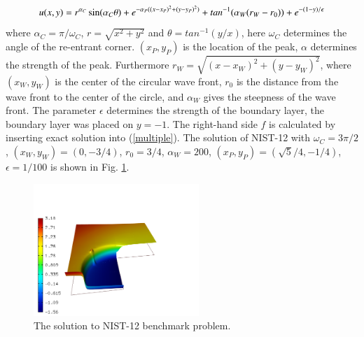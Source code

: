 \documentclass[12pt]{elsarticle}
\begin{document}
\[
u(x,y) =  r^{\alpha_{C} }\sin(\alpha_{C} \theta)
+ e^{-\alpha_{P} ((x - x_{P})^{2} + (y - y_{P})^{2})}
+ tan^{-1}(\alpha_{W} (r_{W} - r_{0})) \\
+ e^{-(1 - y) / \epsilon}
\]
where $\alpha_C = \pi / \omega_C$, $r = \sqrt{x^2+y^2}$
and $\theta = tan^{-1}(y/x)$, here $\omega_C$ determines
the angle of the re-entrant corner.
$(x_{P}, y_{P})$ is the location of the peak, $\alpha$
determines the strength of the peak. Furthermore
$r_{W} = \sqrt{(x - x_{W})^{2} + (y - y_{W})^{2}}$,
where $(x_{W}, y_{W})$ is the center of the circular wave front,
$r_{0}$ is the distance from the wave front to the
center of the circle, and $\alpha_W$ gives
the steepness of the wave front. The parameter $\epsilon$ determines the
strength of the boundary layer, the boundary layer was placed on $y = -1$.
The right-hand side $f$ is calculated by inserting exact solution into (\ref{multiple}).
The solution of NIST-12 with $\omega_C = 3 \pi /2$,
$(x_{W}, y_{W}) = (0, -3/4)$, $r_{0} = 3/4$, $\alpha_{W} = 200$,
$(x_{P}, y_{P}) = (\sqrt{5} / 4, -1/4)$,
$\epsilon = 1/100$ is shown in Fig. \ref{fig:sln-nist12}.

\begin{figure}[!ht]
\centering
\vspace{-5mm}
\includegraphics[height=5cm]{nist/nist-12/solution.png}
\caption{The solution to NIST-12 benchmark problem.}
\label{fig:sln-nist12}
\end{figure}
\end{document}
